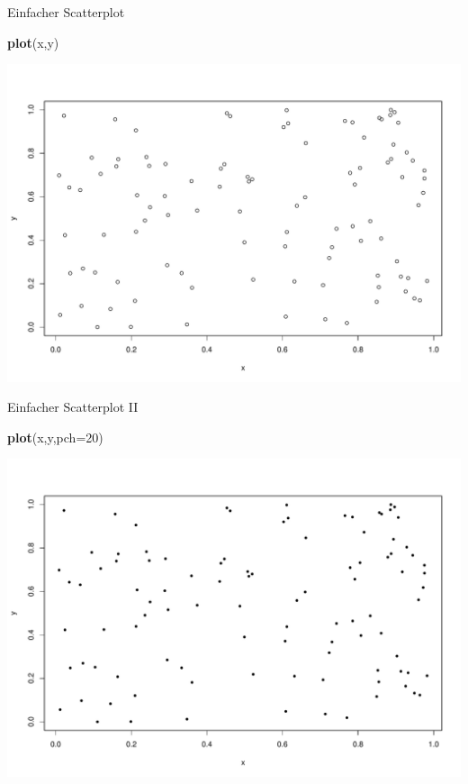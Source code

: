 \documentclass[ignorenonframetext,]{beamer}
\newenvironment{Shaded}{}{}
\newcommand{\KeywordTok}[1]{\textcolor[rgb]{0.00,0.44,0.13}{\textbf{{#1}}}}
\newcommand{\DataTypeTok}[1]{\textcolor[rgb]{0.56,0.13,0.00}{{#1}}}
\newcommand{\DecValTok}[1]{\textcolor[rgb]{0.25,0.63,0.44}{{#1}}}
\newcommand{\NormalTok}[1]{{#1}}
\begin{document}
\begin{frame}[fragile]{Einfacher Scatterplot}

\begin{Shaded}
\begin{Highlighting}[]
\KeywordTok{plot}\NormalTok{(x,y)}
\end{Highlighting}
\end{Shaded}

\includegraphics{R_intern_files/figure-beamer/unnamed-chunk-210-1.pdf}

\end{frame}

\begin{frame}[fragile]{Einfacher Scatterplot II}

\begin{Shaded}
\begin{Highlighting}[]
\KeywordTok{plot}\NormalTok{(x,y,}\DataTypeTok{pch=}\DecValTok{20}\NormalTok{)}
\end{Highlighting}
\end{Shaded}

\includegraphics{R_intern_files/figure-beamer/unnamed-chunk-211-1.pdf}

\end{frame}
\end{document}
